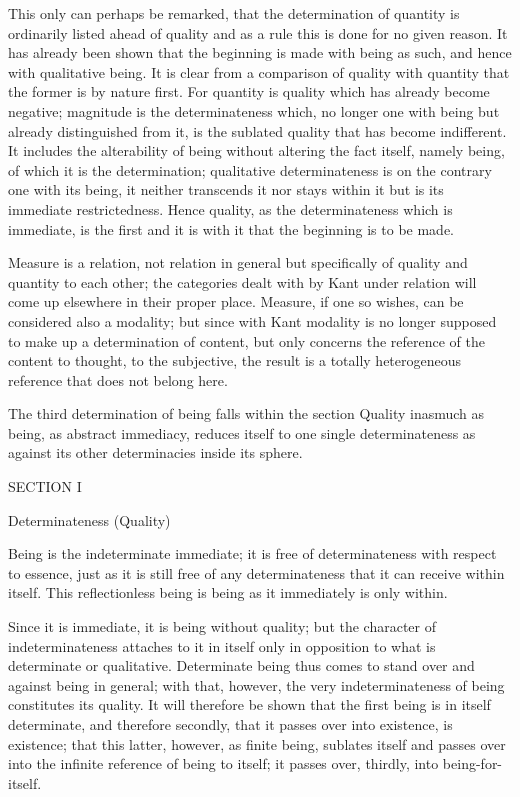 This only can perhaps be remarked,
that the determination of quantity
is ordinarily listed ahead of quality and as a rule
this is done for no given reason.
It has already been shown that
the beginning is made with being as such,
and hence with qualitative being.
It is clear from a comparison of quality with quantity
that the former is by nature first.
For quantity is quality which has already become negative;
magnitude is the determinateness which,
no longer one with being but already distinguished from it,
is the sublated quality that has become indifferent.
It includes the alterability of being
without altering the fact itself,
namely being, of which it is the determination;
qualitative determinateness is on the contrary one with its being,
it neither transcends it nor stays within it
but is its immediate restrictedness.
Hence quality, as the determinateness which is immediate,
is the first and it is with it that the beginning is to be made.

Measure is a relation, not relation in general
but specifically of quality and quantity to each other;
the categories dealt with by Kant under relation
will come up elsewhere in their proper place.
Measure, if one so wishes, can be considered also a modality;
but since with Kant modality is no longer
supposed to make up a determination of content,
but only concerns the reference of the content
to thought, to the subjective,
the result is a totally heterogeneous reference
that does not belong here.

The third determination of being falls within
the section Quality inasmuch as being, as abstract immediacy,
reduces itself to one single determinateness
as against its other determinacies inside its sphere.

SECTION I

Determinateness (Quality)

Being is the indeterminate immediate;
it is free of determinateness with respect to essence,
just as it is still free of any determinateness
that it can receive within itself.
This reflectionless being is being
as it immediately is only within.

Since it is immediate, it is being without quality;
but the character of indeterminateness attaches to it in itself
only in opposition to what is determinate or qualitative.
Determinate being thus comes to stand over and against being in general;
with that, however, the very indeterminateness of being
constitutes its quality.
It will therefore be shown that the first being is
in itself determinate, and therefore secondly,
that it passes over into existence, is existence;
that this latter, however, as finite being, sublates itself
and passes over into the infinite reference of being to itself;
it passes over, thirdly, into being-for-itself.

